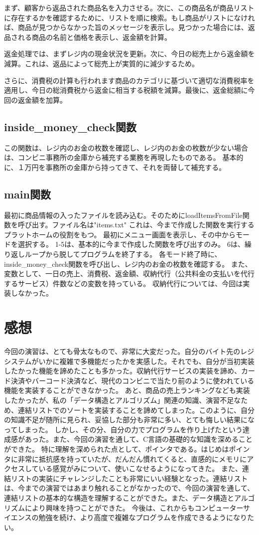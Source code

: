 \documentclass[a4j,11pt]{jarticle}
\begin{document}
まず、顧客から返品された商品名を入力させる。次に、この商品名が商品リストに存在するかを確認するために、リストを順に検索。もし商品がリストになければ、商品が見つからなかった旨のメッセージを表示し。見つかった場合には、返品される商品の名前と価格を表示し、返金額を計算。

返金処理では、まずレジ内の現金状況を更新。次に、今日の総売上から返金額を減算。これは、返品によって総売上が実質的に減少するため。

さらに、消費税の計算も行われます商品のカテゴリに基づいて適切な消費税率を適用し、今日の総消費税から返金に相当する税額を減算。最後に、返金総額に今回の返金額を加算。
\subsection{inside\_money\_check関数}
この関数は、レジ内のお金の枚数を確認し、レジ内のお金の枚数が少ない場合は、コンビニ事務所の金庫から補充する業務を再現したものである。
基本的に、１万円を事務所の金庫から持ってきて、それを両替して補充する。
\subsection{main関数}
最初に商品情報の入ったファイルを読み込む。そのためにloadItemsFromFile関数を呼び出す。ファイル名は"items.txt"
これは、今まで作成した関数を実行するプラットホームの役割をもつ。
最初にメニュー画面を表示し、その中からモードを選択する。
1-5は、基本的に今まで作成した関数を呼び出すのみ。
6は、繰り返しループから脱してプログラムを終了する。
各モード終了時に、inside\_money\_check関数を呼び出し、レジ内のお金の枚数を確認する。
また、変数として、一日の売上、消費税、返金額、収納代行（公共料金の支払いを代行するサービス）件数などの変数を持っている。
収納代行については、今回は実装しなかった。
\section{感想}
今回の演習は、とても骨太なもので、非常に大変だった。自分のバイト先のレジシステムがいかに複雑で多機能だったかを実感した。それでも、自分が当初実装したかった機能を諦めたことも多かった。収納代行サービスの実装を諦め、カード決済やバーコード決済など、現代のコンビニで当たり前のように使われている機能を実装することができなかった。
あと、商品の売上ランキングなども実装したかったが、私の「データ構造とアルゴリズム」関連の知識、演習不足なため、連結リストでのソートを実装することを諦めてしまった。このように、自分の知識不足が随所に見られ、妥協した部分も非常に多い、とても悔しい結果になってしまった。
しかし、その分、自分の力でプログラムを作り上げたという達成感があった。また、今回の演習を通して、C言語の基礎的な知識を深めることができた。
特に理解を深められた点として、ポインタである。はじめはポインタに非常に抵抗感を持っていたが、だんだん慣れてくると、直感的にメモリにアクセスしている感覚がみについて、使いこなせるようになってきた。
また、連結リストの実装にチャレンジしたことも非常にいい経験となった。連結リストは、今までの演習ではあまり触れることがなかったので、今回の演習を通して、連結リストの基本的な構造を理解することができた。また、データ構造とアルゴリズムにより興味を持つことができた。
今後は、これからもコンピューターサイエンスの勉強を続け、より高度で複雑なプログラムを作成できるようになりたい。
\end{document}
